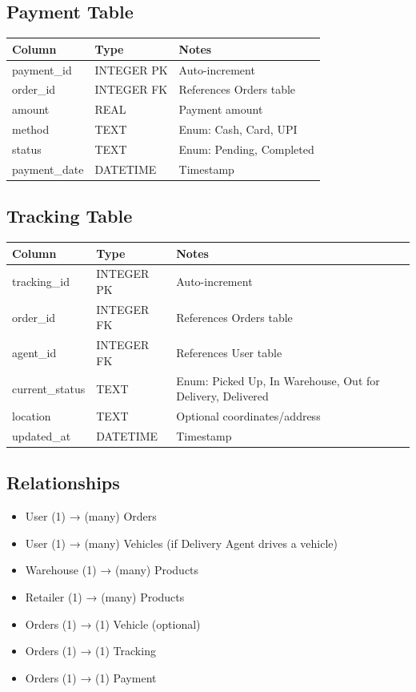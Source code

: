 \documentclass[12pt,a4paper]{article}
\begin{document}
\subsection{Payment Table}
\begin{longtable}{|l|l|l|}
\hline
\textbf{Column} & \textbf{Type} & \textbf{Notes} \\
\hline
payment\_id & INTEGER PK & Auto-increment \\
order\_id & INTEGER FK & References Orders table \\
amount & REAL & Payment amount \\
method & TEXT & Enum: Cash, Card, UPI \\
status & TEXT & Enum: Pending, Completed \\
payment\_date & DATETIME & Timestamp \\
\hline
\end{longtable}

\subsection{Tracking Table}
\begin{longtable}{|l|l|l|}
\hline
\textbf{Column} & \textbf{Type} & \textbf{Notes} \\
\hline
tracking\_id & INTEGER PK & Auto-increment \\
order\_id & INTEGER FK & References Orders table \\
agent\_id & INTEGER FK & References User table \\
current\_status & TEXT & Enum: Picked Up, In Warehouse, Out for Delivery, Delivered \\
location & TEXT & Optional coordinates/address \\
updated\_at & DATETIME & Timestamp \\
\hline
\end{longtable}

\subsection{Relationships}
\begin{itemize}[noitemsep]
    \item User (1) → (many) Orders
    \item User (1) → (many) Vehicles (if Delivery Agent drives a vehicle)
    \item Warehouse (1) → (many) Products
    \item Retailer (1) → (many) Products
    \item Orders (1) → (1) Vehicle (optional)
    \item Orders (1) → (1) Tracking
    \item Orders (1) → (1) Payment
\end{itemize}
\end{document}
